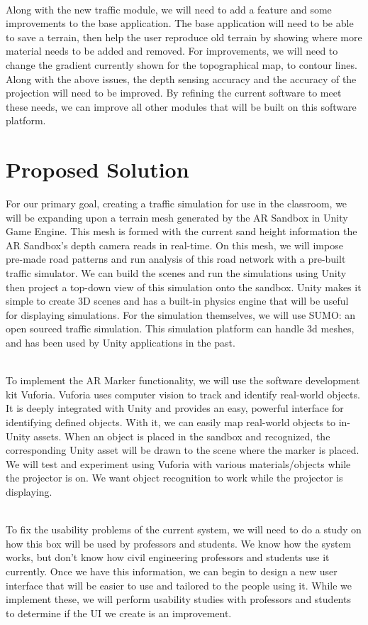 \documentclass[letterpaper, 10pt, onecolumn, draftclsnofoot]{IEEEtran}
\begin{document}
\\
Along with the new traffic module, we will need to add a feature and some improvements to the base application. The base application will need to be able to save a terrain, then help the user reproduce old terrain by showing where more material needs to be added and removed. For improvements, we will need to change the gradient currently shown for the topographical map, to contour lines. Along with the above issues, the depth sensing accuracy and the accuracy of the projection will need to be improved. By refining the current software to meet these needs, we can improve all other modules that will be built on this software platform.

\section{Proposed Solution}
For our primary goal, creating a traffic simulation for use in the classroom, we will be expanding upon a terrain mesh generated by the AR Sandbox in Unity Game Engine. This mesh is formed with the current sand height information the AR Sandbox’s depth camera reads in real-time. On this mesh, we will impose pre-made road patterns and run analysis of this road network with a pre-built traffic simulator. We can build the scenes and run the simulations using Unity then project a top-down view of this simulation onto the sandbox. Unity makes it simple to create 3D scenes and has a built-in physics engine that will be useful for displaying simulations. For the simulation themselves, we will use SUMO: an open sourced traffic simulation. This simulation platform can handle 3d meshes, and has been used by Unity applications in the past. 

\\
To implement the AR Marker functionality, we will use the software development kit Vuforia. Vuforia uses computer vision to track and identify real-world objects. It is deeply integrated with Unity and provides an easy, powerful interface for identifying defined objects. With it, we can easily map real-world objects to in-Unity assets. When an object is placed in the sandbox and recognized, the corresponding Unity asset will be drawn to the scene where the marker is placed. We will test and experiment using Vuforia with various materials/objects while the projector is on. We want object recognition to work while the projector is displaying. 

\\
To fix the usability problems of the current system, we will need to do a study on how this box will be used by professors and students. We know how the system works, but don't know how civil engineering professors and students use it currently. Once we have this information, we can begin to design a new user interface that will be easier to use and tailored to the people using it. While we implement these, we will perform usability studies with professors and students to determine if the UI we create is an improvement.
\end{document}
